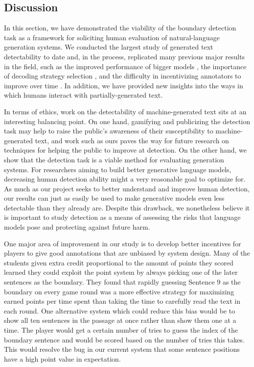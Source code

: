 \subsection{Discussion}
\label{section:roft_discussion}
In this section, we have demonstrated the viability of the boundary detection task as a framework for soliciting human evaluation of natural-language generation systems.
We conducted the largest study of generated text detectability to date and, in the process, replicated many previous major results in the field, such as the improved performance of bigger models \citep{kaplan2020scaling}, the importance of decoding strategy selection \citep{ippolito-etal-2020-automatic}, and the difficulty in incentivizing annotators to improve over time \citep{clark2021all}.
In addition, we have provided new insights into the ways in which humans interact with partially-generated text.

In terms of ethics, work on the detectability of machine-generated text sits at an interesting balancing point.
On one hand, gamifying and publicizing the detection task may help to raise the public's awareness of their susceptibility to machine-generated text, and work such as ours paves the way for future research on techniques for helping the public to improve at detection.
On the other hand, we show that the detection task is a viable method for evaluating generation systems.
For researchers aiming to build better generative language models, decreasing human detection ability might a very reasonable goal to optimize for.
As much as our project seeks to better understand and improve human detection, our results can just as easily be used to make generative models even less detectable than they already are.
Despite this drawback, we nonetheless believe it is important to study detection as a means of assessing the risks that language models pose and protecting against future harm.

One major area of improvement in our study is to develop better incentives for players to give good annotations that are unbiased by system design.
Many of the students given extra credit proportional to the amount of points they scored learned they could exploit the point system by always picking one of the later sentences as the boundary.
They found that rapidly guessing Sentence 9 as the boundary on every game round was a more effective strategy for maximizing earned points per time spent than taking the time to carefully read the text in each round.
One alternative system which could reduce this bias would be to show all ten sentences in the passage at once rather than show them one at a time.
The player would get a certain number of tries to guess the index of the boundary sentence and would be scored based on the number of tries this takes.
This would resolve the bug in our current system that some sentence positions have a high point value in expectation.

